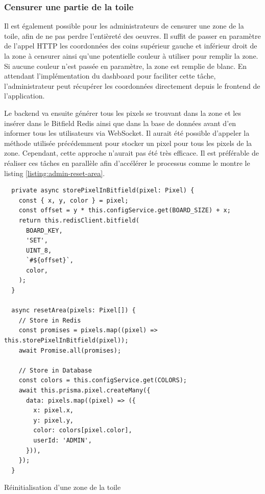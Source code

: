 \subsubsection{Censurer une partie de la toile}

Il est également possible pour les administrateurs de censurer une zone de la toile, afin de ne pas perdre l'entièreté des oeuvres. Il suffit de passer en paramètre de l'appel HTTP les coordonnées des coins supérieur gauche et inférieur droit de la zone à censurer ainsi qu'une potentielle couleur à utiliser pour remplir la zone. Si aucune couleur n'est passée en paramètre, la zone est remplie de blanc. En attendant l'implémentation du dashboard pour faciliter cette tâche, l'administrateur peut récupérer les coordonnées directement depuis le frontend de l'application.

Le backend va ensuite générer tous les pixels se trouvant dans la zone et les insérer dans le Bitfield Redis ainsi que dans la base de données avant d'en informer tous les utilisateurs via WebSocket. Il aurait été possible d'appeler la méthode utilisée précédemment pour stocker un pixel pour tous les pixels de la zone. Cependant, cette approche n'aurait pas été très efficace. Il est préférable de réaliser ces tâches en parallèle afin d'accélérer le processus comme le montre le listing \ref{listing:admin-reset-area}.

\begin{listing}[h]
  \begin{verbatim}
  private async storePixelInBitfield(pixel: Pixel) {
    const { x, y, color } = pixel;
    const offset = y * this.configService.get(BOARD_SIZE) + x;
    return this.redisClient.bitfield(
      BOARD_KEY,
      'SET',
      UINT_8,
      `#${offset}`,
      color,
    );
  }

  async resetArea(pixels: Pixel[]) {
    // Store in Redis
    const promises = pixels.map((pixel) => this.storePixelInBitfield(pixel));
    await Promise.all(promises);

    // Store in Database
    const colors = this.configService.get(COLORS);
    await this.prisma.pixel.createMany({
      data: pixels.map((pixel) => ({
        x: pixel.x,
        y: pixel.y,
        color: colors[pixel.color],
        userId: 'ADMIN',
      })),
    });
  }
\end{verbatim}
  \caption{Réinitialisation d'une zone de la toile}
  \label{listing:admin-reset-area}
\end{listing}

